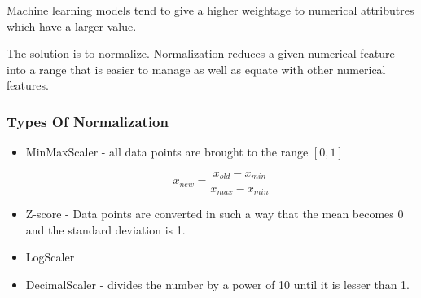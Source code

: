 \documentclass[11pt]{article}
\begin{document}
Machine learning models tend to give a higher weightage to numerical attributres which have a larger value.

The solution is to normalize. Normalization reduces a given numerical feature into a range that is easier to manage as well as equate with other numerical features.
\subsubsection{Types Of Normalization}
\label{sec:org5cb2c07}
\begin{itemize}
\item MinMaxScaler - all data points are brought to the range \([0,1]\)

$$
  x_{new} = \frac{x_{old} - x_{min}}{x_{max} - x_{min}}
  $$
\item Z-score - Data points are converted in such a way that the mean becomes 0 and the standard deviation is 1.
\item LogScaler
\item DecimalScaler - divides the number by a power of 10 until it is lesser than 1.
\end{itemize}
\end{document}
